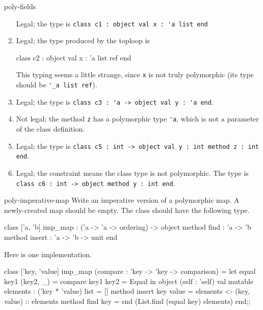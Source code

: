 \begin{exercise}{poly-fields}
\begin{answer}
\begin{enumerate}
Legal; the type is \hbox{\lstinline$class c1 : object val x : 'a list end$}

\item

Legal; the type produced by the toploop is

\begin{ocaml}
class c2 : object val x : 'a list ref end
\end{ocaml}
%
This typing seems a little strange, since \hbox{\lstinline$x$} is not truly
polymorphic (its type should be \hbox{\lstinline$'_a list ref$}).

\item

Legal; the type is \hbox{\lstinline$class c3 : 'a -> object val y : 'a end$}.

\item

Not legal; the method \hbox{\lstinline$z$} has a polymorphic
type \hbox{\lstinline$'a$}, which is not a parameter of the class definition.

\item

Legal; the type is
\hbox{\lstinline$class c5 : int -> object val y : int method z : int end$}.

\item

Legal; the constraint means the class type is not polymorphic.  The type
is \hbox{\lstinline$class c6 : int -> object method y : int end$}.
\end{enumerate}
\fi\end{answer}
\end{exercise}


\begin{exercise}{poly-imperative-map}
Write an imperative version of a polymorphic map.  A newly-created map
should be empty.  The class should have the following type.

\begin{ocaml}
class ['a, 'b] imp_map : ('a -> 'a -> ordering) ->
  object
    method find   : 'a -> 'b
    method insert : 'a -> 'b -> unit
  end
\end{ocaml}

\begin{answer}\ifanswers
Here is one implementation.

\begin{ocaml}
class ['key, 'value] imp_map (compare : 'key -> 'key -> comparison) =
   let equal key1 (key2, _) = compare key1 key2 = Equal in
   object (self : 'self)
      val mutable elements : ('key * 'value) list = []
      method insert key value = elements <- (key, value) :: elements
      method find key = snd (List.find (equal key) elements)
   end;;
\end{ocaml}
\fi\end{answer}
\end{exercise}


